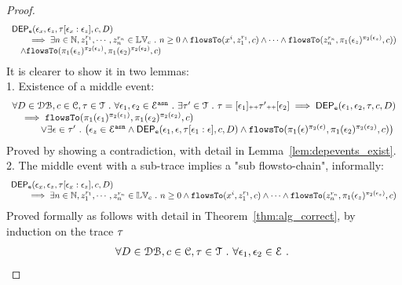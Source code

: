 \begin{proof}
$$\begin{array}{l}
    \mathsf{DEP_{\mathtt{e}}}(\mathtt{\epsilon}_x, \mathtt{\epsilon}_z, \mathtt{\tau}[\mathtt{\epsilon}_x: \mathtt{\epsilon}_z], c, D)
    \\ \qquad 
    \implies 
    \exists n \in \mathbb{N}, z_1^{r_1}, \cdots, z_n^{r_n} \in \mathbb{LV}_{{c}} ~.~ n \geq 0 \land
\mathtt{flowsTo}(x^i,  z_1^{r_1}, c) 
\land \cdots \land \mathtt{flowsTo}(z_n^{r_n},  \pi_1(\mathtt{\epsilon}_z)^{\pi_2(\mathtt{\epsilon}_z)}, c)
    )
    \\ \quad
    \land 
    \mathtt{flowsTo}(\pi_1(\mathtt{\epsilon}_z)^{\pi_2(\mathtt{\epsilon}_z)}, \pi_1(\mathtt{\epsilon}_2)^{\pi_2(\mathtt{\epsilon}_2)}, c) 
\end{array}
$$
%
It is clearer to show it in two lemmas:
\\
1. Existence of a middle event:
\[
	\begin{array}{l}
		\forall D \in \dbdom , c \in \cdom, \trace \in \mathcal{T} \st \forall \event_1, \event_2 \in \eventset^{\asn} \st
		 \exists \trace' \in \mathcal{T} \st \trace = [\event_1] \tracecat \trace' \tracecat [\event_2]
		\implies
		\eventdep(\event_1, \event_2, \trace, c, D) 
		\\ \quad 
		\implies 
		\flowsto(\pi_1(\event_1)^{\pi_2(\event_1)}, \pi_1(\event_2)^{\pi_2(\event_2)}, c) 
		\\ \qquad \quad \lor
		\exists \event \in \trace' \st 
		\left( 		\event_z \in \eventset^{\asn} \land 
			\eventdep(\event_1, \event, \trace[\event_1:\event], c, D)
		\land 
		\flowsto(\pi_1(\event)^{\pi_2(\event)}, \pi_1(\event_2)^{\pi_2(\event_2)}, c) 
	\right) 
	\end{array}
\]
Proved by showing a contradiction, with detail in Lemma~\ref{lem:depevents_exist}.
%
\\
2. The middle event with a sub-trace implies a "sub flowsto-chain", informally:
%
\[
  \begin{array}{l}
    \mathsf{DEP_{\mathtt{e}}}(\mathtt{\epsilon}_x, \mathtt{\epsilon}_z, \mathtt{\tau}[\mathtt{\epsilon}_x: \mathtt{\epsilon}_z], c, D)
    \\ \qquad 
    \implies 
    \exists n \in \mathbb{N}, z_1^{r_1}, \cdots, z_n^{r_n} \in \mathbb{LV}_{{c}} ~.~ n \geq 0 \land
\mathtt{flowsTo}(x^i,  z_1^{r_1}, c) 
\land \cdots \land \mathtt{flowsTo}(z_n^{r_n},  \pi_1(\mathtt{\epsilon}_z)^{\pi_2(\mathtt{\epsilon}_z)}, c)
\end{array}
\]
%
Proved formally as follows with detail in Theorem~\ref{thm:alg_correct}, by induction on the trace $\mathtt{\tau}$
%
\[
  \begin{array}{l}
		\forall D \in \mathcal{DB} , c \in \mathcal{C}, \mathtt{\tau} \in \mathcal{T} ~.~ \forall \mathtt{\epsilon}_1, \mathtt{\epsilon}_2 \in \mathcal{E} ~.~

\end{array}\]
\end{proof}
